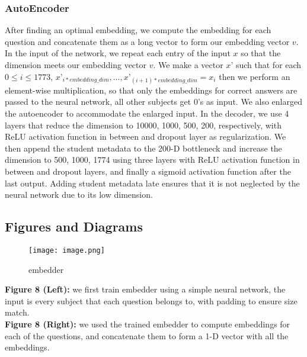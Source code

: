 \documentclass{article}
\begin{document}
\subsubsection*{AutoEncoder}
After finding an optimal embedding, we compute the embedding for each question and concatenate them as a long vector to form our embedding vector $v$. In the input of the network, we repeat each entry of the input $x$ so that the dimension meets our embedding vector $v$. We make a vector $x’$ such that for each $0 \leq i \leq 1773$, $x’_{i*embedding\_dim}, \ldots, x’_{(i+1)*embedding\_dim} = x_i$ then we perform an element-wise multiplication, so that only the embeddings for correct answers are passed to the neural network, all other subjects get 0’s as input. We also enlarged the autoencoder to accommodate the enlarged input. In the decoder, we use 4 layers that reduce the dimension to 10000, 1000, 500, 200, respectively, with ReLU activation function in between and dropout layer as regularization. We then append the student metadata to the 200-D bottleneck and increase the dimension to 500, 1000, 1774 using three layers with ReLU activation function in between and dropout layers, and finally a sigmoid activation function after the last output. Adding student metadata late ensures that it is not neglected by the neural network due to its low dimension.



\subsection*{Figures and Diagrams}

\begin{figure}[H]
    \centerline{\texttt{[image: image.png]}}
    \caption{embedder}
    \label{fig:embedder}
\end{figure}

\textbf{Figure 8 (Left):} we first train embedder using a simple neural network, the input is every subject that each question belongs to, with padding to ensure size match.
\\
\textbf{Figure 8 (Right):} we used the trained embedder to compute embeddings for each of the questions, and concatenate them to form a 1-D vector with all the embeddings.

\end{document}
